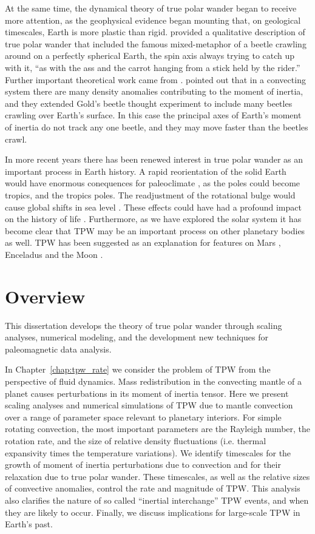 At the same time, the dynamical theory of true polar wander began to receive more attention,
as the geophysical evidence began mounting that, on geological timescales, Earth is more
plastic than rigid. \citet{gold1955instability} provided a qualitative description of
true polar wander that included the famous mixed-metaphor of a beetle crawling
around on a perfectly spherical Earth, the spin axis always trying to catch up with it,
``as with the ass and the carrot hanging from a stick held by the rider.''
Further important theoretical work came from \citet{munk1960rotation}.
\citet{goldreich1969some} pointed out that in a convecting system there
are many density anomalies contributing to the moment of inertia,
and they extended Gold's beetle thought experiment to include many beetles crawling over Earth's surface. 
In this case the principal axes of Earth's moment of inertia do not track any one beetle,
and they may move faster than the beetles crawl.

In more recent years there has been renewed interest in true polar wander as an important process in Earth history.
A rapid reorientation of the solid Earth would have enormous conequences for paleoclimate \citep{kirschvink1997evidence},
as the poles could become tropics, and the tropics poles. The readjustment of the rotational
bulge would cause global shifts in sea level \citep{mound1999sea}.
These effects could have had a profound impact on the history of life \citep[e.g][]{kirschvink2003methane}.
Furthermore, as we have explored the solar system it has become clear that TPW
may be an important process on other planetary bodies as well.
TPW has been suggested as an explanation for features on Mars \citep{perron2007evidence},
Enceladus \citep{nimmo2006diapir} and the Moon \citep{garrick2014tidal}.


\section{Overview}

This dissertation develops the theory of true polar wander through scaling analyses,
numerical modeling, and the development new techniques for paleomagnetic data analysis.

In Chapter~\ref{chap:tpw_rate} we consider the problem of TPW from the perspective of fluid dynamics.
Mass redistribution in the convecting mantle of a planet causes perturbations in its moment of inertia tensor. 
Here we present scaling analyses and numerical simulations of TPW due to mantle convection over a range of parameter space relevant to planetary interiors. 
For simple rotating convection, the most important parameters are the Rayleigh number, the rotation rate, and the size of relative density fluctuations 
(i.e. thermal expansivity times the temperature variations). 
We identify timescales for the growth of moment of inertia perturbations due to convection and for their relaxation due to true polar wander. 
These timescales, as well as the relative sizes of convective anomalies, control the rate and magnitude of TPW.
This analysis also clarifies the nature of so called ``inertial interchange'' TPW events, and when they are likely to occur.
Finally, we discuss implications for large-scale TPW in Earth's past.

